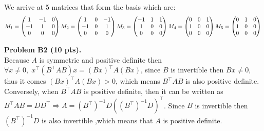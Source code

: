 \documentclass[12pt]{article}
\begin{document}
We arrive at 5 matrices that form the basis which are:
$$M_1 = \begin{pmatrix} 1 & -1 & 0 \\ -1 & 1 & 0\\ 0 & 0 & 0 \end{pmatrix} \\
M_2 = \begin{pmatrix} 1 & 0 & -1 \\ -1 & 0 & 1\\ 0 & 0 & 0 \end{pmatrix} \\
M_3 = \begin{pmatrix} -1 & 1 & 1 \\ 1 & 0 & 0\\ 0 & 0 & 0 \end{pmatrix}\\
M_4 = \begin{pmatrix} 0 & 0 & 1 \\ 1 & 0 & 0\\ 0 & 0 & 0 \end{pmatrix}\\
M_5 = \begin{pmatrix} 0 & 1 & 0 \\ 1 & 0 & 0\\ 0 & 0 & 0 \end{pmatrix}\\
$$


\vspace {0.25cm}\noindent
{\bf Problem B2 (10 pts).} \\
Because $A$ is symmetric and positive definite then $\forall x \neq 0, \; x^\top (B^\top A B) x = (Bx)^\top A (Bx)$, since $B$ is invertible then $Bx \neq 0$, thus it comes $(Bx)^\top A (Bx) > 0$, which means $B^\top A B$ is also positive definite.\\
Conversely, when $B^\top A B$ is positive definite, then it can be written as $B^\top A B = D D^\top \Rightarrow A = (B^\top)^{-1} D ((B^\top)^{-1} D )^\top$. Since $B$ is invertible then $ (B^\top)^{-1} D$ is also invertible  ,which means that $A$ is positive definite.
\end{document}
